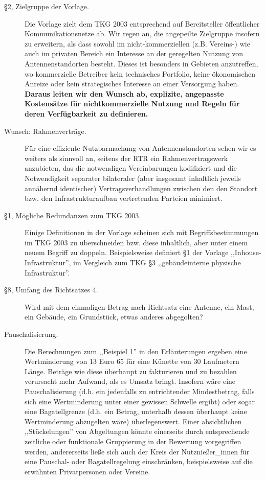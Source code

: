 \documentclass[parskip=half]{scrreprt}
\begin{document}
\begin{description}

\item[§2, Zielgruppe der Vorlage.] Die Vorlage zielt dem TKG 2003
entsprechend auf Bereitsteller öffentlicher Kommunikationsnetze ab.
Wir regen an, die angepeilte Zielgruppe insofern zu erweitern, als dass
sowohl im nicht-kommerziellen (z.B. Vereins-) wie auch im privaten
Bereich ein Interesse an der geregelten Nutzung von Antennenstandorten
besteht. Dieses ist besonders in Gebieten anzutreffen, wo kommerzielle
Betreiber kein technisches Portfolio, keine ökonomischen Anreize
oder kein strategisches Interesse an einer Versorgung haben.
\textbf{Daraus leiten wir den Wunsch ab, explizite, angepasste
Kostensätze für nichtkommerzielle Nutzung und Regeln für deren
Verfügbarkeit zu definieren.}

\item[Wunsch: Rahmenverträge.] Für eine effiziente Nutzbarmachung von
Antennenstandorten sehen wir es weiters als sinnvoll an, seitens der
RTR ein Rahmenvertragswerk anzubieten, das die notwendigen Vereinbarungen
kodifiziert und die Notwendigkeit separater bilateraler (aber insgesamt
inhaltlich jeweils annähernd identischer) Vertragsverhandlungen
zwischen den den Standort bzw. den Infrastrukturaufbau vertretenden
Parteien minimiert.

\item[§1, Mögliche Redundanzen zum TKG 2003.] Einige Definitionen in der
Vorlage scheinen sich mit Begriffsbestimmungen im TKG 2003 zu
überschneiden bzw. diese inhaltlich, aber unter einem neuem Begriff zu
doppeln. Beispielsweise definiert §1 der Vorlage ,,Inhouse-Infrastruktur'',
im Vergleich zum TKG §3 ,,gebäudeinterne physische Infrastruktur''.

\item[§8, Umfang des Richtsatzes 4.] Wird mit dem einmaligen Betrag
nach Richtsatz eine Antenne, ein Mast, ein Gebäude, ein Grundstück,
etwas anderes abgegolten?

\item[Pauschalisierung.] Die Berechnungen zum
,,Beispiel 1'' in den
Erläuterungen ergeben eine Wertminderung von 13 Euro 65 für eine
Künette von 30 Laufmetern Länge. Beträge wie diese überhaupt zu
fakturieren und zu bezahlen verursacht mehr Aufwand, als es Umsatz
bringt. Insofern wäre eine Pauschalisierung (d.h. ein jedenfalls zu
entrichtender Mindestbetrag, falls sich eine Wertminderung unter
einer gewissen Schwelle ergibt) oder sogar eine Bagatellgrenze
(d.h. ein Betrag, unterhalb dessen überhaupt keine Wertminderung
abzugelten wäre) überlegenswert. Einer absichtlichen ,,Stückelungen''
von Abgeltungen könnte einerseits durch entsprechende zeitliche oder
funktionale Gruppierung in der Bewertung vorgegriffen werden,
andererseits ließe sich auch der Kreis der Nutznießer\_innen für
eine Pauschal- oder Bagatellregelung einschränken, beispielsweise
auf die erwähnten Privatpersonen oder Vereine.



\end{description}
\end{document}
